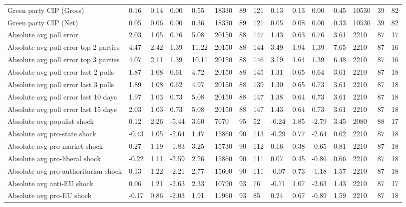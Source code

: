 \begin{longtable}{lllllllllllllll}
\addlinespace
Green party CIP (Gross) & 0.16 & 0.14 & 0.00 & 0.55 & 18330 & 89 & 121 & 0.13 & 0.13 & 0.00 & 0.45 & 10530 & 39 & 82\\
Green party CIP (Net) & 0.05 & 0.06 & 0.00 & 0.36 & 18330 & 89 & 121 & 0.05 & 0.08 & 0.00 & 0.33 & 10530 & 39 & 82\\
Absolute avg poll error & 2.03 & 1.05 & 0.76 & 5.08 & 20150 & 88 & 147 & 1.43 & 0.63 & 0.76 & 3.61 & 2210 & 87 & 17\\
Absolute avg poll error top 2 parties & 4.47 & 2.42 & 1.39 & 11.22 & 20150 & 88 & 144 & 3.49 & 1.94 & 1.39 & 7.65 & 2210 & 87 & 16\\
Absolute avg poll error top 3 parties & 4.07 & 2.11 & 1.39 & 10.11 & 20150 & 88 & 146 & 3.19 & 1.64 & 1.39 & 6.48 & 2210 & 87 & 16\\
\addlinespace
Absolute avg poll error last 2 polls & 1.87 & 1.08 & 0.61 & 4.72 & 20150 & 88 & 145 & 1.31 & 0.65 & 0.64 & 3.61 & 2210 & 87 & 18\\
Absolute avg poll error last 3 polls & 1.89 & 1.08 & 0.62 & 4.97 & 20150 & 88 & 139 & 1.30 & 0.65 & 0.73 & 3.61 & 2210 & 87 & 18\\
Absolute avg poll error last 10 days & 1.97 & 1.03 & 0.73 & 5.08 & 20150 & 88 & 147 & 1.38 & 0.64 & 0.73 & 3.61 & 2210 & 87 & 18\\
Absolute avg poll error last 15 days & 2.03 & 1.03 & 0.73 & 5.08 & 20150 & 88 & 147 & 1.43 & 0.64 & 0.73 & 3.61 & 2210 & 87 & 18\\
Absolute avg populist shock & 0.12 & 2.26 & -5.44 & 3.60 & 7670 & 95 & 52 & -0.24 & 1.85 & -2.79 & 3.45 & 2080 & 88 & 17\\
\addlinespace
Absolute avg pro-state shock & -0.43 & 1.05 & -2.64 & 1.47 & 15860 & 90 & 113 & -0.29 & 0.77 & -2.64 & 0.62 & 2210 & 87 & 18\\
Absolute avg pro-market shock & 0.27 & 1.19 & -1.83 & 3.25 & 15730 & 90 & 112 & 0.16 & 0.38 & -0.65 & 0.81 & 2210 & 87 & 18\\
Absolute avg pro-liberal shock & -0.22 & 1.11 & -2.59 & 2.26 & 15860 & 90 & 111 & 0.07 & 0.45 & -0.86 & 0.66 & 2210 & 87 & 18\\
Absolute avg pro-authoritarian shock & 0.13 & 1.22 & -2.21 & 2.77 & 15600 & 90 & 111 & -0.07 & 0.73 & -1.18 & 1.57 & 2210 & 87 & 18\\
Absolute avg anti-EU shock & 0.06 & 1.21 & -2.63 & 2.33 & 10790 & 93 & 76 & -0.71 & 1.07 & -2.63 & 1.43 & 2210 & 87 & 17\\
\addlinespace
Absolute avg pro-EU shock & -0.17 & 0.86 & -2.03 & 1.91 & 11960 & 93 & 85 & 0.24 & 0.67 & -0.89 & 1.59 & 2210 & 87 & 18\\

\end{longtable}
